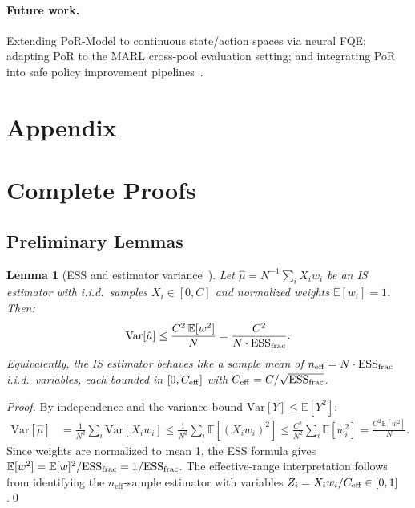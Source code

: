 \documentclass[10pt]{article}
\theoremstyle{plain}
\newtheorem{lemma}[theorem]{Lemma}
\theoremstyle{definition}
\theoremstyle{remark}
\newcommand{\E}{\mathbb{E}}
\newcommand{\Var}{\mathrm{Var}}
\newcommand{\ESS}{\mathrm{ESS}}
\newcommand{\neff}{n_{\mathrm{eff}}}
\begin{document}
\paragraph{Future work.}
Extending PoR-Model to continuous state/action spaces via neural FQE;
adapting PoR to the MARL cross-pool evaluation setting; and integrating
PoR into safe policy improvement pipelines~\citep{thomas2015high}.




\newpage
\appendix
\section*{Appendix}

\section{Complete Proofs}
\label{app:proofs}

\subsection{Preliminary Lemmas}
\label{app:lemmas}

\begin{lemma}[ESS and estimator variance~\citep{hesterberg1995weighted}]
  \label{lem:ess_variance}
  Let $\hat{\mu}=N^{-1}\sum_i X_i w_i$ be an IS estimator with i.i.d.\
  samples $X_i\in[0,C]$ and normalized weights $\E[w_i]=1$.  Then:
  \begin{equation}
    \mathrm{Var}[\hat{\mu}] \leq \frac{C^2\,\E[w^2]}{N}
    = \frac{C^2}{N\cdot\ESS_{\rm frac}}.
    \label{eq:ess_var}
  \end{equation}
  Equivalently, the IS estimator behaves like a sample mean of
  $\neff=N\cdot\ESS_{\rm frac}$ i.i.d.\ variables, each bounded in
  $[0,C_{\rm eff}]$ with $C_{\rm eff}=C/\sqrt{\ESS_{\rm frac}}$.
\end{lemma}

\begin{proof}
  By independence and the variance bound $\Var[Y]\leq\E[Y^2]$:
  \begin{align*}
    \Var[\hat{\mu}] &= \frac{1}{N^2}\sum_i\Var[X_i w_i]
    \leq \frac{1}{N^2}\sum_i\E[(X_i w_i)^2]
    \leq \frac{C^2}{N^2}\sum_i\E[w_i^2]
    = \frac{C^2\E[w^2]}{N}.
  \end{align*}
  Since weights are normalized to mean 1, the ESS formula gives
  $\E[w^2]=\E[w]^2/\ESS_{\rm frac}=1/\ESS_{\rm frac}$.  The effective-range
  interpretation follows from identifying the $\neff$-sample estimator with
  variables $Z_i=X_i w_i/C_{\rm eff}\in[0,1]$.\qed
\end{proof}
\end{document}

